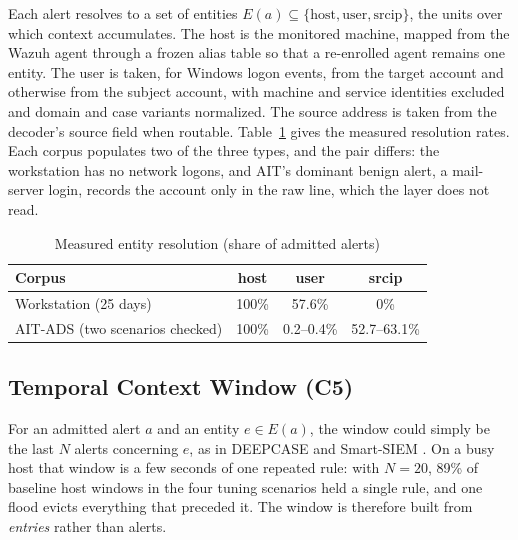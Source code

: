 \documentclass[conference]{IEEEtran}
\begin{document}
Each alert resolves to a set of entities $E(a) \subseteq \{\mathrm{host}, \mathrm{user}, \mathrm{srcip}\}$, the units over which context accumulates. The host is the monitored machine, mapped from the Wazuh agent through a frozen alias table so that a re-enrolled agent remains one entity. The user is taken, for Windows logon events, from the target account and otherwise from the subject account, with machine and service identities excluded and domain and case variants normalized. The source address is taken from the decoder's source field when routable. Table~\ref{tab:resolution} gives the measured resolution rates. Each corpus populates two of the three types, and the pair differs: the workstation has no network logons, and AIT's dominant benign alert, a mail-server login, records the account only in the raw line, which the layer does not read.

\begin{table}[t]
\caption{Measured entity resolution (share of admitted alerts)}
\label{tab:resolution}
\centering\footnotesize
\begin{tabular}{@{}lccc@{}}
\toprule
\textbf{Corpus} & \textbf{host} & \textbf{user} & \textbf{srcip} \\
\midrule
Workstation (25 days) & 100\% & 57.6\% & 0\% \\
AIT-ADS (two scenarios checked) & 100\% & 0.2--0.4\% & 52.7--63.1\% \\
\bottomrule
\end{tabular}
\end{table}

\subsection{Temporal Context Window (C5)}
\label{sec:window}

For an admitted alert $a$ and an entity $e \in E(a)$, the window could simply be the last $N$ alerts concerning $e$, as in DEEPCASE \cite{ref15} and Smart-SIEM \cite{ref17}. On a busy host that window is a few seconds of one repeated rule: with $N = 20$, 89\% of baseline host windows in the four tuning scenarios held a single rule, and one flood evicts everything that preceded it. The window is therefore built from \emph{entries} rather than alerts.
\end{document}
